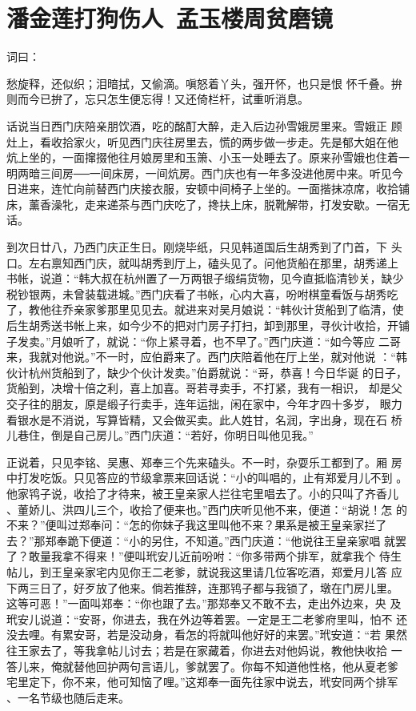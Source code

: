 \chapter{潘金莲打狗伤人~孟玉楼周贫磨镜}

词曰：

愁旋释，还似织；泪暗拭，又偷滴。嗔怒着丫头，强开怀，也只是恨
怀千叠。拚则而今已拚了，忘只怎生便忘得！又还倚栏杆，试重听消息。

话说当日西门庆陪亲朋饮酒，吃的酩酊大醉，走入后边孙雪娥房里来。雪娥正
顾灶上，看收拾家火，听见西门庆往房里去，慌的两步做一步走。先是郁大姐在他
炕上坐的，一面撺掇他往月娘房里和玉箫、小玉一处睡去了。原来孙雪娥也住着一
明两暗三间房──一间床房，一间炕房。西门庆也有一年多没进他房中来。听见今
日进来，连忙向前替西门庆接衣服，安顿中间椅子上坐的。一面揩抹凉席，收拾铺
床，薰香澡牝，走来递茶与西门庆吃了，搀扶上床，脱靴解带，打发安歇。一宿无
话。

到次日廿八，乃西门庆正生日。刚烧毕纸，只见韩道国后生胡秀到了门首，下
头口。左右禀知西门庆，就叫胡秀到厅上，磕头见了。问他货船在那里，胡秀递上
书帐，说道：“韩大叔在杭州置了一万两银子缎绢货物，见今直抵临清钞关，缺少
税钞银两，未曾装载进城。”西门庆看了书帐，心内大喜，吩咐棋童看饭与胡秀吃
了，教他往乔亲家爹那里见见去。就进来对吴月娘说：“韩伙计货船到了临清，使
后生胡秀送书帐上来，如今少不的把对门房子打扫，卸到那里，寻伙计收拾，开铺
子发卖。”月娘听了，就说：“你上紧寻着，也不早了。”西门庆道：“如今等应
二哥来，我就对他说。”不一时，应伯爵来了。西门庆陪着他在厅上坐，就对他说
：“韩伙计杭州货船到了，缺少个伙计发卖。”伯爵就说：“哥，恭喜！今日华诞
的日子，货船到，决增十倍之利，喜上加喜。哥若寻卖手，不打紧，我有一相识，
却是父交子往的朋友，原是缎子行卖手，连年运拙，闲在家中，今年才四十多岁，
眼力看银水是不消说，写算皆精，又会做买卖。此人姓甘，名润，字出身，现在石
桥儿巷住，倒是自己房儿。”西门庆道：“若好，你明日叫他见我。”

正说着，只见李铭、吴惠、郑奉三个先来磕头。不一时，杂耍乐工都到了。厢
房中打发吃饭。只见答应的节级拿票来回话说：“小的叫唱的，止有郑爱月儿不到
。他家鸨子说，收拾了才待来，被王皇亲家人拦往宅里唱去了。小的只叫了齐香儿
、董娇儿、洪四儿三个，收拾了便来也。”西门庆听见他不来，便道：“胡说！怎
的不来？”便叫过郑奉问：“怎的你妹子我这里叫他不来？果系是被王皇亲家拦了
去？”那郑奉跪下便道：“小的另住，不知道。”西门庆道：“他说往王皇亲家唱
就罢了？敢量我拿不得来！”便叫玳安儿近前吩咐：“你多带两个排军，就拿我个
侍生帖儿，到王皇亲家宅内见你王二老爹，就说我这里请几位客吃酒，郑爱月儿答
应下两三日了，好歹放了他来。倘若推辞，连那鸨子都与我锁了，墩在门房儿里。
这等可恶！”一面叫郑奉：“你也跟了去。”那郑奉又不敢不去，走出外边来，央
及玳安儿说道：“安哥，你进去，我在外边等着罢。一定是王二老爹府里叫，怕不
还没去哩。有累安哥，若是没动身，看怎的将就叫他好好的来罢。”玳安道：“若
果然往王家去了，等我拿帖儿讨去；若是在家藏着，你进去对他妈说，教他快收拾
一答儿来，俺就替他回护两句言语儿，爹就罢了。你每不知道他性格，他从夏老爹
宅里定下，你不来，他可知恼了哩。”这郑奉一面先往家中说去，玳安同两个排军
、一名节级也随后走来。

